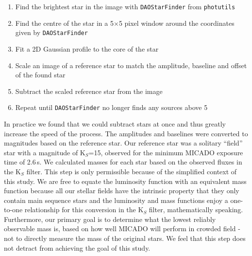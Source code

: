 \begin{enumerate}
    \item Find the brightest star in the image with \verb+DAOStarFinder+ from \verb+photutils+ \citep{photutils}
    \item Find the centre of the star in a 5$\times$5 pixel window around the coordinates given by \verb+DAOStarFinder+
    \item Fit a 2D Gaussian profile to the core of the star
    \item Scale an image of a reference star to match the amplitude, baseline and offset of the found star
    \item Subtract the scaled reference star from the image
    \item Repeat until \verb+DAOStarFinder+ no longer finds any sources above 5\,\sig
\end{enumerate}

In practice we found that we could subtract  stars at once and thus greatly increase the speed of the process. The amplitudes and baselines were converted to magnitudes based on the reference star. Our reference star was a solitary ``field'' star with a magnitude of K$_S$=15, observed for the minimum {MICADO} exposure time of 2.6\,s. We calculated masses for each star based on the observed fluxes in the K$_S$ filter. This step is only permissible because of the simplified context of this study. We are free to equate the luminosity function with an equivalent mass function because all our stellar fields have the intrinsic property that they only contain main sequence stars and the luminosity and mass functions enjoy a one-to-one relationship for this conversion in the K$_S$ filter, mathematically speaking. Furthermore, our primary goal is to determine what the lowest reliably observable mass is, based on how well MICADO will perform in crowded field - not to directly measure the mass of the original stars. We feel that this step does not detract from achieving the goal of this study.


